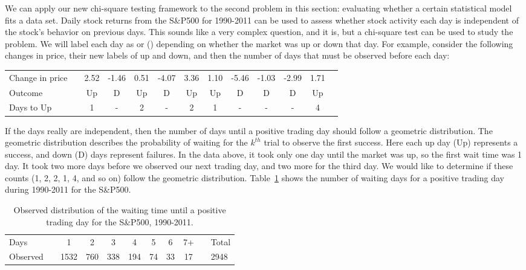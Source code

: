 
We can apply our new chi-square testing framework to the second problem in this section: evaluating whether a certain statistical model fits a data set. Daily stock returns from the S\&P500 for 1990-2011 can be used to assess whether stock activity each day is independent of the stock's behavior on previous days. This sounds like a very complex question, and it is, but a chi-square test can be used to study the problem. We will label each day as  or  () depending on whether the market was up or down that day. For example, consider the following changes in price, their new labels of up and down, and then the number of days that must be observed before each  day:
\begin{center}\footnotesize
\begin{tabular}{lc ccc ccc ccc cc}
Change in price		&\hspace{-1mm}	& \footnotesize2.52 &
	\footnotesize-1.46 & \footnotesize 0.51 &
	\footnotesize-4.07 & \footnotesize3.36 &
	\footnotesize1.10 &
	\footnotesize-5.46 & \footnotesize-1.03 & \footnotesize-2.99 & \footnotesize1.71 \\
Outcome	 & \hspace{-1mm} &
	Up &
	D & Up &
	D & Up &
	Up &
	D & D & D & Up \\
\footnotesize Days to Up & \hspace{-1mm} & 1 & - & 2 & - & 2 & 1 & - & - & - & 4 \\
\end{tabular}
\end{center}
If the days really are independent, then the number of days until a positive trading day should follow a geometric distribution. The geometric distribution describes the probability of waiting for the $k^{th}$ trial to observe the first success. Here each up day (Up) represents a success, and down (D) days represent failures. In the data above, it took only one day until the market was up, so the first wait time was 1 day. It took two more days before we observed our next  trading day, and two more for the third  day. We would like to determine if these counts (1, 2, 2, 1, 4, and so on) follow the geometric distribution. Table~\ref{sAndP500For1990To2011TimeToPosTrade} shows the number of waiting days for a positive trading day during 1990-2011 for the S\&P500.

\begin{table}[h]
\centering
\begin{tabular}{ll ccc ccc c ll}
\hline
Days	 & \hspace{2mm} & 1 & 2 & 3 & 4 & 5 & 6 & 7+ & \hspace{2mm} & Total \\
Observed &		& 1532 & 760 & 338 & 194 & 74 & 33 & 17 & & 2948 \\
\hline
\end{tabular}
\caption{Observed distribution of the waiting time until a positive trading day for the S\&P500, 1990-2011.}
\label{sAndP500For1990To2011TimeToPosTrade}
\end{table}

